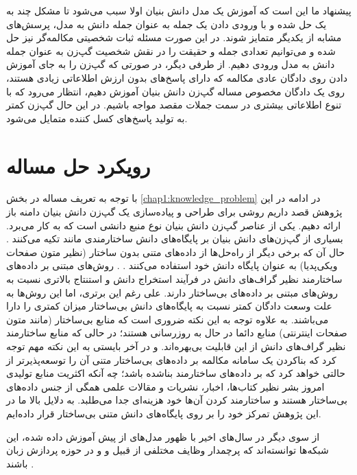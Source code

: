 پیشنهاد ما این است که آموزش یک مدل دانش بنیان اولا سبب می‌شود تا مشکل چند به یک حل شده و با ورودی دادن یک جمله به عنوان جمله دانش به مدل، پرسش‌های مشابه از یکدیگر متمایز شوند. در این صورت مسئله ثبات شخصیتی مکالمه‌گر نیز حل شده و می‌توانیم تعدادی جمله و حقیقت را در نقش شخصیت گپ‌زن به عنوان جمله دانش به مدل ورودی دهیم. از طرفی دیگر، در صورتی که گپ‌زن را به جای آموزش دادن روی دادگان عادی مکالمه که دارای پاسخ‌های بدون ارزش اطلاعاتی زیادی هستند، روی یک دادگان مخصوص مساله گپ‌زن دانش بنیان آموزش دهیم، انتظار می‌رود که با تنوع اطلاعاتی بیشتری در سمت جملات مقصد مواجه باشیم. در این حال گپ‌زن کمتر به تولید پاسخ‌های کسل کننده متمایل می‌شود. 


\section{رویکرد حل مساله} \label{chap1:problem_solving_approach}

با توجه به تعریف مساله در بخش 
\ref{chap1:knowledge_problem}
در ادامه  در این پژوهش قصد داریم روشی برای طراحی و پیاده‌سازی یک گپ‌زن دانش بنیان دامنه باز ارائه دهیم. 
یکی از عناصر گپ‌زن دانش بنیان نوع منبع دانشی است که به کار می‌برد. بسیاری از گپ‌زن‌های دانش بنیان بر پایگاه‌های دانش ساختارمندی مانند 
تکیه می‌کنند
\cite{zhou2018commonsense, tuan2019dykgchat}.
حال آن که برخی دیگر از راه‌حل‌ها از داده‌های متنی بدون ساختار (نظیر متون صفحات ویکی‌پدیا) به عنوان پایگاه دانش خود استفاده می‌کنند
\cite{wizard,a_knowledge_grounded,Topical_Chat}.
 . روش‌های مبتنی بر داده‌های ساختارمند نظیر گراف‌های دانش در فرآیند استخراج دانش و استنتاج 
بالاتری نسبت به روش‌های مبتنی بر داده‌های بی‌ساختار دارند.
علی رغم این برتری، اما این روش‌ها به علت وسعت دادگان کمتر نسبت به پایگاه‌های دانش بی‌ساختار میزان
کمتری را دارا می‌باشند.
به علاوه توجه به این نکته ضروری است که منابع بی‌ساختار (مانند متون صفحات اینترنتی) منابع دائما در حال به روزرسانی هستند؛ در حالی که منابع ساختارمند نظیر گراف‌های‌ دانش از این قابلیت بی‌بهره‌اند. 
و در آخر بایستی به این نکته مهم توجه کرد که بناکردن یک سامانه مکالمه بر داده‌های بی‌ساختار متنی آن را توسعه‌پذیرتر از حالتی خواهد کرد که بر داده‌های ساختارمند بناشده باشد؛ چه آنکه اکثریت منابع تولیدی امروز بشر نظیر کتاب‌ها، اخبار، نشریات و مقالات علمی همگی از جنس‌ داده‌های بی‌ساختار هستند و ساختارمند کردن آن‌ها خود هزینه‌ای جدا می‌طلبد.
به دلایل بالا ما در این پژوهش تمرکز خود را بر روی پایگاه‌های دانش متنی بی‌ساختار قرار داده‌ایم.

از سوی دیگر در سال‌های اخیر با ظهور مدل‌های از پیش آموزش داده شده،
این شبکه‌ها توانسته‌اند که پرچمدار
 وظایف مختلفی از قبیل
و
و
  در حوزه پردازش زبان باشند
\cite{bert, gpt2}.

